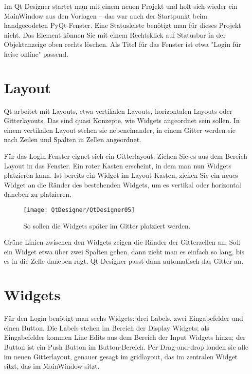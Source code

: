 Im Qt Designer startet man mit einem neuen Projekt und holt sich wieder ein MainWindow aus den Vorlagen – das war auch der Startpunkt beim handgecodeten PyQt-Fenster. Eine Statusleiste benötigt man für dieses Projekt nicht. Das Element können Sie mit einem Rechtsklick auf Statusbar in der Objektanzeige oben rechts löschen. Als Titel für das Fenster ist etwa "Login für heise online" passend.

\section{Layout}

Qt arbeitet mit Layouts, etwa vertikalen Layouts, horizontalen Layouts oder Gitterlayouts. Das sind quasi Konzepte, wie Widgets angeordnet sein sollen. In einem vertikalen Layout stehen sie nebeneinander, in einem Gitter werden sie nach Zeilen und Spalten in Zellen angeordnet.

Für das Login-Fenster eignet sich ein Gitterlayout. Ziehen Sie es aus dem Bereich Layout in das Fenster. Ein roter Kasten erscheint, in dem man nun Widgets platzieren kann. Ist bereits ein Widget im Layout-Kasten, ziehen Sie ein neues Widget an die Ränder des bestehenden Widgets, um es vertikal oder horizontal daneben zu platzieren.

\begin{figure}
  \begin{center}
    \texttt{[image: QtDesigner/QtDesigner05]}
    \caption{So sollen die Widgets später im Gitter platziert werden.}
  \end{center}
\end{figure}


Grüne Linien zwischen den Widgets zeigen die Ränder der Gitterzellen an. Soll ein Widget etwa über zwei Spalten gehen, dann zieht man es einfach so lang, bis es in die Zelle daneben ragt. Qt Designer passt dann automatisch das Gitter an.

\section{Widgets}

Für den Login benötigt man sechs Widgets: drei Labels, zwei Eingabefelder und einen Button. Die Labels stehen im Bereich der Display Widgets; als Eingabefelder kommen Line Edits aus dem Bereich der Input Widgets hinzu; der Button ist ein Push Button im Button-Bereich. Per Drag-and-drop landen sie alle im neuen Gitterlayout, genauer gesagt im gridlayout, das im zentralen Widget sitzt, das im MainWindow sitzt.

